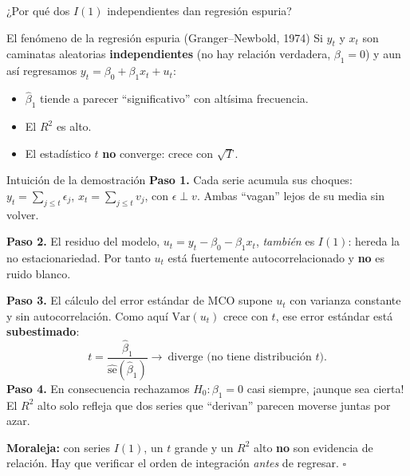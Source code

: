 \documentclass{beamer}
\begin{document}
\begin{frame}[allowframebreaks]{¿Por qué dos $I(1)$ independientes dan regresión espuria?}

\begin{alertblock}{El fenómeno de la regresión espuria (Granger--Newbold, 1974)}
Si $y_t$ y $x_t$ son caminatas aleatorias \textbf{independientes} (no hay relación verdadera, $\beta_1=0$) y aun así regresamos $y_t=\beta_0+\beta_1 x_t+u_t$:
\begin{itemize}
  \item $\hat\beta_1$ tiende a parecer ``significativo'' con altísima frecuencia.
  \item El $R^2$ es alto.
  \item El estadístico $t$ \textbf{no} converge: crece con $\sqrt{T}$.
\end{itemize}
\end{alertblock}

\begin{exampleblock}{Intuición de la demostración}
\textbf{Paso 1.} Cada serie acumula sus choques: $y_t=\sum_{j\le t}\epsilon_j$, $x_t=\sum_{j\le t}v_j$, con $\epsilon\perp v$. Ambas ``vagan'' lejos de su media sin volver.

\textbf{Paso 2.} El residuo del modelo, $u_t=y_t-\beta_0-\beta_1 x_t$, \emph{también} es $I(1)$: hereda la no estacionariedad. Por tanto $u_t$ está fuertemente autocorrelacionado y \textbf{no} es ruido blanco.

\framebreak

\textbf{Paso 3.} El cálculo del error estándar de MCO supone $u_t$ con varianza constante y sin autocorrelación. Como aquí $\text{Var}(u_t)$ crece con $t$, ese error estándar está \textbf{subestimado}:
\[
t = \frac{\hat\beta_1}{\widehat{\text{se}}(\hat\beta_1)} \xrightarrow[\text{} ]{}\ \text{diverge (no tiene distribución } t).
\]
\textbf{Paso 4.} En consecuencia rechazamos $H_0:\beta_1=0$ casi siempre, ¡aunque sea cierta! El $R^2$ alto solo refleja que dos series que ``derivan'' parecen moverse juntas por azar.

\textbf{Moraleja:} con series $I(1)$, un $t$ grande y un $R^2$ alto \textbf{no} son evidencia de relación. Hay que verificar el orden de integración \emph{antes} de regresar. \hfill $\square$
\end{exampleblock}

\end{frame}
\end{document}
